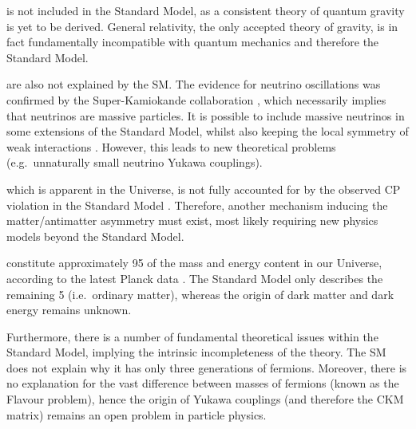 \begin{description}[wide=\parindent]
\item [Gravity] is not included in the Standard Model, as a consistent theory of quantum gravity is yet to be derived.
General relativity, the only accepted theory of gravity, is in fact fundamentally incompatible with quantum mechanics
and therefore the Standard Model.
\item [Massive neutrinos] are also not explained by the SM. The evidence for neutrino oscillations was confirmed by the
Super-Kamiokande collaboration \autocite{neutrino_oscillations}, which necessarily implies that neutrinos are massive
particles. It is possible to include massive neutrinos in some extensions of the Standard Model, whilst also keeping the
local symmetry of weak interactions \autocite{Shaposhnikov_nuMSM}. However, this leads to new theoretical problems
(e.g.\ unnaturally small neutrino Yukawa couplings).
\item [Matter/antimatter asymmetry,] which is apparent in the Universe, is not fully accounted for by the observed CP
violation in the Standard Model \autocite{Peskin_matter_antimatter, matter_antimatter_asymmetry}. Therefore, another
mechanism inducing the matter/antimatter asymmetry must exist, most likely requiring new physics models beyond the
Standard Model.

\item [Dark matter and dark energy] constitute approximately \SI{95}{\pc} of the mass and energy content in our
Universe, according to the latest Planck data \autocite{planck2013-p01, planck2013-p11}. The Standard Model only
describes the remaining \SI{5}{\pc} (i.e.\ ordinary matter), whereas the origin of dark matter and dark energy remains
unknown.
\end{description}

Furthermore, there is a number of fundamental theoretical issues within the Standard Model, implying the intrinsic
incompleteness of the theory. The SM does not explain why it has only three generations of fermions. Moreover, there is
no explanation for the vast difference between masses of fermions (known as the Flavour problem), hence the origin of
Yukawa couplings (and therefore the CKM matrix) remains an open problem in particle physics.

